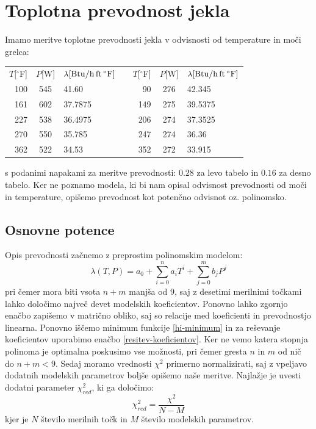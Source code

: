 \documentclass[slovene,11pt,a4paper]{article}
\numberwithin{equation}{section} %
\numberwithin{figure}{section} %
\numberwithin{table}{section} %
\begin{document}
\section{Toplotna prevodnost jekla}

Imamo meritve toplotne prevodnosti jekla v odvisnosti od temperature in moči grelca:
  \begin{center}
    \begin{tabular}{r|c|lcr|c|l}
      $T$[$^\circ$F]&$P$[W]&$\lambda\rm[Btu/h\, ft\,^\circ F]$&\qquad\qquad&
      $T$[$^\circ$F]&$P$[W]&$\lambda\rm[Btu/h\, ft\,^\circ F]$\\
      \cline{1-3}\cline{5-7}
      100  &      545    &       41.60     &&      90   &     276    &   42.345\\
      161  &      602    &       37.7875   &&     149   &     275    &   39.5375\\
      227  &      538    &       36.4975   &&     206   &     274    &   37.3525\\
      270  &      550    &       35.785    &&     247   &     274    &   36.36\\
      362  &      522    &       34.53     &&     352   &     272    &   33.915
    \end{tabular}
  \end{center}
s podanimi napakami za meritve prevodnosti: $0.28$ za levo tabelo in $0.16$ za desno tabelo. Ker ne poznamo modela, ki bi nam opisal odvisnost prevodnosti od moči in temperature, opišemo prevodnost kot potenčno odvisnot oz. polinomsko.


\subsection{Osnovne potence}

Opis prevodnosti začnemo z preprostim polinomskim modelom:
\begin{equation*}
\lambda(T,P) = a_0 + \sum_{i=0}^n a_i T^i + \sum_{j=0}^m b_j P^j
\end{equation*}
pri čemer mora biti vsota $n+m$ manjša od $9$, saj z desetimi merilnimi točkami lahko določimo največ devet modelskih koeficientov. Ponovno lahko zgornjo enačbo zapišemo v matrično obliko, saj so relacije med koeficienti in prevodnostjo linearna. Ponovno iščemo minimum funkcije \ref{hi-minimum} in za reševanje koeficientov uporabimo enačbo \ref{resitev-koeficientov}. Ker ne vemo katera stopnja polinoma je optimalna poskusimo vse možnosti, pri čemer gresta $n$ in $m$ od nič do $n+m<9$. Sedaj moramo vrednosti $\chi^2$ primerno normalizirati, saj z vpeljavo dodatnih modelskih parametrov boljše opišemo naše meritve. Najlažje je uvesti dodatni parameter $\chi^2_{red}$, ki ga določimo:
\begin{equation*}
\chi^2_{red}=\frac{\chi^2}{N-M}
\end{equation*}
kjer je $N$ število merilnih točk in $M$ število modelskih parametrov.
\end{document}
